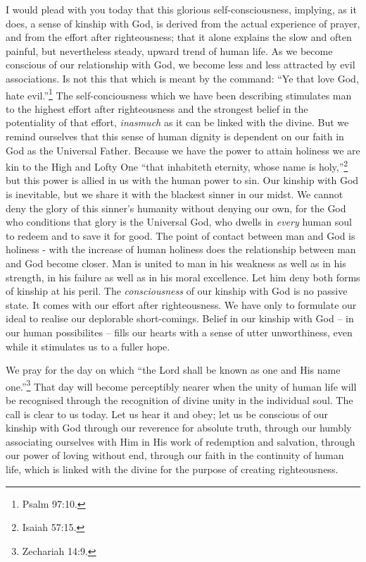 I would plead with you today that this glorious self-consciousness,
implying, as it does, a sense of kinship
with God, is derived from the actual experience of prayer,
and from the effort after righteousness; that it alone
explains the slow and often painful, but nevertheless
steady, upward trend of human life. As we become conscious
of our relationship with God, we become less and less
attracted by evil associations. Is not this that which is
meant by the command: ``Ye that love God, hate evil.''\footnote{Psalm 97:10.} The
self-conciousness which we have been describing stimulates
man to the highest effort after righteousness and the
strongest belief in the potentiality of that effort,
\textsl{inasmuch} as it can be linked with the divine. But we
remind ourselves that this sense of human dignity is dependent
on our faith in God as the Universal Father. Because
we have the power to attain holiness we are kin to the High
and Lofty One ``that inhabiteth eternity, whose name is
holy,''\footnote{Isaiah 57:15.} but this power is allied in us with the human power
to sin. Our kinship with God is inevitable, but we share
it with the blackest sinner in our midst. We cannot deny
the glory of this sinner's humanity without denying our
own, for the God who conditions that glory is the Universal
God, who dwells in \textsl{every} human soul to redeem and to save
it for good. The point of contact between man and God is
holiness - with the increase of human holiness does the
relationship between man and God become closer. Man is
united to man in his weakness as well as in his strength,
in his failure as well as in his moral excellence. Let him
deny both forms of kinship at his peril. The \textsl{consciousness}
of our kinship with God is no passive state. It comes with
our effort after righteousness. We have only to formulate
our ideal to realise our deplorable short-comings. Belief
in our kinship with God -- in our human possibilites -- fills
our hearts with a sense of utter unworthiness, even while
it stimulates us to a fuller hope.

We pray for the day on which ``the Lord shall be known
as one and His name one.''\footnote{Zechariah 14:9.} That day will become
perceptibly nearer when the unity of human life will be
recognised through the recognition of divine unity in the
individual soul. The call is clear to us today. Let us
hear it and obey; let us be conscious of our kinship with
God through our reverence for absolute truth, through our
humbly associating ourselves with Him in His work of
redemption and salvation, through our power of loving
without end, through our faith in the continuity of human
life, which is linked with the divine for the purpose of
creating righteousness.


